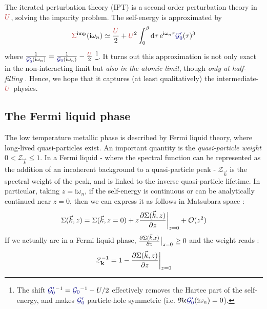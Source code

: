 \documentclass[reprint,amsmath,amssymb,aps,pra]{revtex4-2}
\newcommand{\mathe}{\mathrm{e}}
\newcommand{\mathi}{\mathrm{i}}
\newcommand{\iwn}{\mathrm{i}\omega_n}
\begin{document}
The iterated perturbation theory (IPT) is a second order perturbation
theory in ${\color[HTML]{BF4040}U}$, solving the impurity problem. The self-energy is approximated by
\begin{equation}
    {\color[HTML]{BF4040}\Sigma}^\text{imp} (\iwn) \simeq \frac{{\color[HTML]{BF4040}U}}{2} + {\color[HTML]{BF4040}U}^2 
    \int_0^{\beta} \dd{\tau} \mathe^{\iwn \tau} 
    {\color[HTML]{000080}\mathcal{G}_0'} (\tau)^3
\label{IPT} 
\end{equation}
where $ \frac{1}{{\color[HTML]{000080}\mathcal{G}_0'} (\iwn)} = \frac{1}{{\color[HTML]{000080}\mathcal{G}_0} (\iwn)} - \frac{{\color[HTML]{BF4040}U}}{2}$ \footnote{The shift ${\color[HTML]{000080}\mathcal{G}_0'}^{- 1} =
{\color[HTML]{000080}\mathcal{G}_0}^{- 1} - U / 2$ effectively removes the
Hartee part of the self-energy, and makes
${\color[HTML]{000080}\mathcal{G}_0'}$ particle-hole symmetric (i.e.
$\mathfrak{R}\mathfrak{e} {\color[HTML]{000080}\mathcal{G}_0'} (\mathi
\omega_n) = 0$).}. It turns out this approximation is not only exact in the non-interacting limit but \emph{also in the atomic limit}, though \emph{only at half-filling} \cite{Georges1996}. Hence, we hope that it captures (at least qualitatively) the intermediate-${\color[HTML]{BF4040}U}$ physics.

\subsection{The Fermi liquid phase}

The low temperature metallic phase is described by Fermi liquid theory, where long-lived quasi-particles exist. An important quantity is the \emph{quasi-particle weight} $0 < \mathcal{Z}_{\vec{k}} \leq 1$. In a Fermi liquid \-- where the spectral function can be represented as the addition of an incoherent background to a quasi-particle peak \-- $\mathcal{Z}_{\vec{k}}$ is the spectral weight of the peak, and is linked to the inverse quasi-particle lifetime. In particular, taking $z=\iwn$, if the self-energy is continuous or can be analytically continued near $z=0$, then we can express it as follows in Matsubara space :
\[
\Sigma(\vec{k}, z) = \Sigma(\vec{k}, z = 0) + z \pdv{\Sigma(\vec{k}, z)}{z}\bigg|_{z=0} + \mathcal{O}(z^2)
\]
If we actually are in a Fermi liquid phase,  $\pdv{\Sigma(\vec{k}, z)}{z}\big|_{z=0} \geq 0$ and the weight reads :
\begin{equation}
\mathcal{Z}_{\textbf{k}}^{-1} = 1 - \pdv{\Sigma(\vec{k}, z)}{z}\bigg|_{z=0}
\label{quasi-p-weight}
\end{equation}
\end{document}
